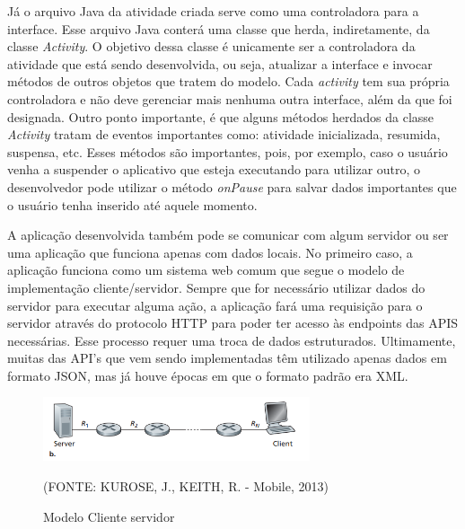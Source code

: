 \documentclass[
    12pt,       %
    openright,      %
    twoside,      %
    a4paper,      %
    english,      %
    french,       %
    spanish,      %
    brazil,       %
    ]{abntex2}
\begin{document}
        Já o arquivo Java da atividade criada serve como uma controladora para a interface. Esse
        arquivo Java conterá uma classe que herda, indiretamente, da classe \textit{Activity}. O
        objetivo dessa classe é unicamente ser a controladora da atividade que está sendo
        desenvolvida, ou seja, atualizar a interface e invocar métodos de outros objetos que tratem
        do modelo. Cada \textit{activity} tem sua própria controladora e não deve gerenciar mais
        nenhuma outra interface, além da que foi designada. Outro ponto importante, é que alguns métodos
        herdados da classe \textit{Activity} tratam de eventos importantes como: atividade inicializada,
        resumida, suspensa, etc. Esses métodos são importantes, pois, por exemplo, caso o usuário
        venha a suspender o aplicativo que esteja executando para utilizar outro, o desenvolvedor
        pode utilizar o método \textit{onPause} para salvar dados importantes que o usuário tenha
        inserido até aquele momento.

        A aplicação desenvolvida também pode se comunicar com algum servidor ou ser uma aplicação
        que funciona apenas com dados locais. No primeiro caso, a aplicação funciona como um sistema
        web comum que segue o modelo de implementação cliente/servidor. Sempre que for necessário
        utilizar dados do servidor para executar alguma ação, a aplicação fará uma requisição para
        o servidor através do protocolo HTTP para poder ter acesso às endpoints das APIS
        necessárias. Esse processo requer uma troca de dados estruturados. Ultimamente, muitas das
        API's que vem sendo implementadas têm utilizado apenas dados em formato JSON, mas já houve
        épocas em que o formato padrão era XML.

        \begin{figure}[htbp]
            \begin{center}
                \includegraphics[width=0.7\textwidth]{img/clientServer.png}
            \end{center}
        \caption{\label{fig:passaro} Modelo Cliente servidor}
        \begin{center}(FONTE: KUROSE, J., KEITH, R. - Mobile, 2013)\end{center}
        \end{figure}
\end{document}
